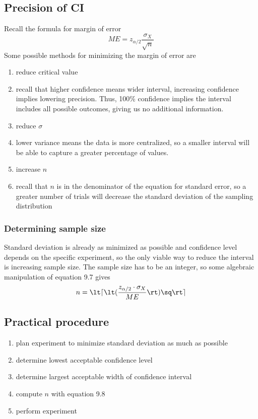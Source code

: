 \subsection{Precision of CI}  %
Recall the formula for margin of error
\begin{equation}
    ME=z_{\alpha/2}\frac{\sigma_X}{\sqrt n}
\end{equation}
Some possible methods for minimizing the margin of error are
\begin{enumerate}
    \item reduce critical value
    \item[] recall that higher confidence means wider interval, increasing confidence implies lowering precision. Thus, 100\% confidence implies the interval includes all possible outcomes, giving us no additional information.
    \item reduce \(\sigma\)
    \item[] lower variance means the data is more centralized, so a smaller interval will be able to capture a greater percentage of values.
    \item increase \(n\)
    \item[] recall that \(n\) is in the denominator of the equation for standard error, so a greater number of trials will decrease the standard deviation of the sampling distribution
\end{enumerate}

\subsubsection{Determining sample size}  %
Standard deviation is already as minimized as possible and confidence level depends on the specific experiment, so the only viable way to reduce the interval is increasing sample size. The sample size has to be an integer, so some algebraic manipulation of equation 9.7 gives
\begin{equation}
    n=\lt\lceil\lt(\frac{z_{\alpha/2}\cdot \sigma_X}{ME}\rt)\sq\rt\rceil
\end{equation}

\subsection{Practical procedure}  %
\begin{enumerate}
    \item plan experiment to minimize standard deviation as much as possible
    \item determine lowest acceptable confidence level
    \item determine largest acceptable width of confidence interval
    \item compute \(n\) with equation 9.8
    \item perform experiment
\end{enumerate}


